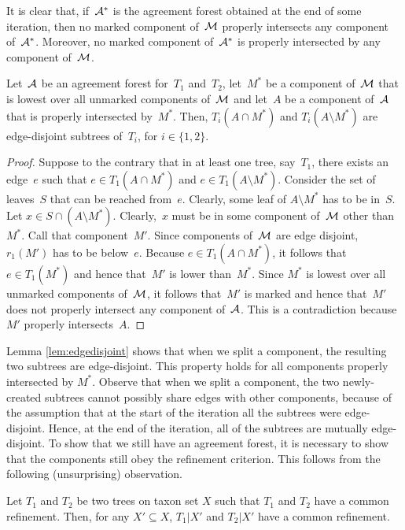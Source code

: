 It is clear that, if~${\mathcal A}^*$ is the agreement forest obtained at the end of some iteration, then no marked component of~${\mathcal M}$ properly intersects any component of~${\mathcal A}^*$. Moreover, no marked component of~${\mathcal A}^*$ is properly intersected by any component of~${\mathcal M}$.

\begin{lemma}
\label{lem:edgedisjoint}
Let~${\mathcal A}$ be an agreement forest for~$T_1$ and~$T_2$, let~$M^*$ be a component of~${\mathcal M}$ that is lowest over all unmarked components of~${\mathcal M}$ and let~$A$ be a component of~${\mathcal A}$ that is properly intersected by~$M^*$. Then, $T_i(A \cap M^*)$ and $T_i(A\setminus M^*)$ are edge-disjoint subtrees of~$T_i$, for $i\in\{1,2\}$.
\end{lemma}
\begin{proof}
Suppose to the contrary that in at least one tree, say~$T_1$, there exists an edge~$e$ such that $e\in T_1(A \cap M^*)$ and $e\in T_1(A\setminus M^*)$. Consider the set of leaves~$S$ that can be reached from~$e$. Clearly, some leaf of $A\setminus M^*$ has to be in~$S$. Let $x\in S \cap (A\setminus M^*)$. Clearly,~$x$ must be in some component of~${\mathcal M}$ other than~$M^*$. Call that component~$M'$. Since components of~${\mathcal M}$ are edge disjoint, $r_1(M')$ has to be below~$e$. Because $e\in T_1(A \cap M^*)$, it follows that $e\in T_1(M^*)$ and hence that~$M'$ is lower than~$M^*$. Since $M^*$ is lowest over all unmarked components of~${\mathcal M}$, it follows that~$M'$ is marked and hence that~$M'$ does not properly intersect any component of~${\mathcal A}$. This is a contradiction because~$M'$ properly intersects~$A$.
\end{proof}

Lemma \ref{lem:edgedisjoint} shows that when we split a component, the resulting two subtrees are edge-disjoint. This property holds for all components properly intersected by $M^{*}$. Observe that when we split a component, the two newly-created subtrees cannot possibly share edges with other components, because of the assumption that at the start of the iteration all the subtrees were edge-disjoint. Hence, at the end of the iteration, all of the subtrees are mutually edge-disjoint. To show that we still have an agreement forest, it is necessary to show that the components still obey the refinement criterion. This follows from the following (unsurprising) observation.

\begin{observation}
\label{obs:stillrefine}
Let $T_1$ and $T_2$ be two trees on taxon set $X$ such that $T_1$ and $T_2$ have a common refinement. Then, for any $X' \subseteq X$,  $T_1 | X'$ and $T_2 | X'$ have a common refinement.
\end{observation}

